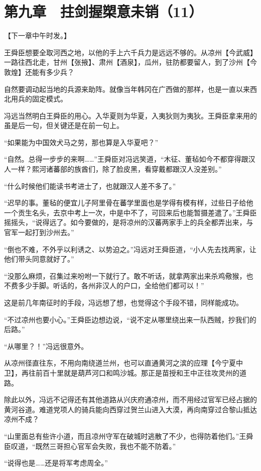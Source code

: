 \section{第九章　拄剑握槊意未销（11）}

【下一章中午时发。】

王舜臣想要全取河西之地，以他的手上六千兵力是远远不够的。从凉州【今武威】一路往西北走，甘州【张掖】、肃州【酒泉】，瓜州，驻防都要留人，到了沙州【今敦煌】还能有多少兵？

自然要调动起当地的兵源来助阵。就像当年韩冈在广西做的那样，也是一直以来西北用兵的固定模式。

冯远当然明白王舜臣的用心。入华夏则为华夏，入夷狄则为夷狄。王舜臣拿来用的虽是后一句，但关键还是在前一句上。

“如果能为中国效犬马之劳，那也算是入华夏吧？”

“自然。总得一步步的来啊……”王舜臣对冯远笑道，“木征、董毡如今不都穿得跟汉人一样？熙河诸蕃部的族酋们，除了脸皮黑，看穿戴都跟汉人没差别。”

“什么时候他们能读书考进士了，也就跟汉人差不多了。”

“迟早的事。董毡的便宜儿子阿里骨在蕃学里面也是学得有模有样，过些日子给他一个贡生名头，去京中考上一次，中是中不了，可回来后也能暂摄差遣了。”王舜臣摇摇头，“说得远了。如今要做的，是将凉州的汉蕃两家手上的兵全都弄出来，与官军一起打到沙州去。”

“倒也不难，不外乎以利诱之、以势迫之。”冯远对王舜臣道，“小人先去找两家，让他们带头同意就好了。”

“没那么麻烦，召集过来吩咐一下就行了。敢不听话，就拿两家出来杀鸡儆猴，也不费多少手脚。听话的，各州非汉人的户口，全给他们都可以！”

这是前几年南征时的手段，冯远想了想，也觉得这个手段不错，同样能成功。

“不过凉州也要小心。”王舜臣边想边说，“说不定从哪里绕出来一队西贼，抄我们的后路。”

“从哪里？！”冯远很意外。

从凉州径直往东，不用向南绕道兰州，也可以直通黄河之滨的应理【今宁夏中卫】，再往前百十里就是葫芦河口和鸣沙城。那正是苗授和王中正往攻灵州的道路。

除此以外，冯远不记得还有其他道路从兴庆府通凉州，而不用经过官军已经占据的黄河谷道。难道党项人的骑兵能向西穿过贺兰山进入大漠，再向南穿过合黎山抵达凉州不成？

“山里面总有些许小道，而且凉州守军在破城时逃散了不少，也得防着他们。”王舜臣叹道，“既然三哥担心官军会失败，我也不能不防着。”

“说得也是……还是将军考虑周全。”

